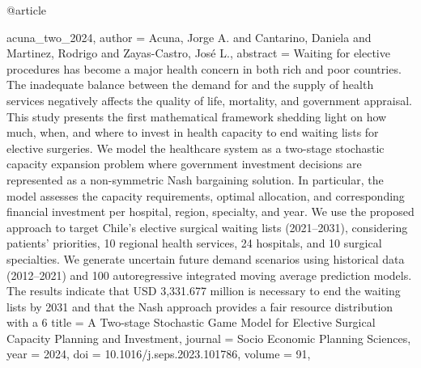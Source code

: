 @article{acuna_two_2024,
  author = {Acuna, Jorge A. and Cantarino, Daniela and Martinez, Rodrigo and Zayas-Castro, José L.},
  abstract = {Waiting for elective procedures has become a major health concern in both rich and poor countries. The inadequate balance between the demand for and the supply of health services negatively affects the quality of life, mortality, and government appraisal. This study presents the first mathematical framework shedding light on how much, when, and where to invest in health capacity to end waiting lists for elective surgeries. We model the healthcare system as a two-stage stochastic capacity expansion problem where government investment decisions are represented as a non-symmetric Nash bargaining solution. In particular, the model assesses the capacity requirements, optimal allocation, and corresponding financial investment per hospital, region, specialty, and year. We use the proposed approach to target Chile's elective surgical waiting lists (2021–2031), considering patients’ priorities, 10 regional health services, 24 hospitals, and 10 surgical specialties. We generate uncertain future demand scenarios using historical data (2012–2021) and 100 autoregressive integrated moving average prediction models. The results indicate that USD 3,331.677 million is necessary to end the waiting lists by 2031 and that the Nash approach provides a fair resource distribution with a 6%
  title = {{A} {Two-stage} {Stochastic} {Game} {Model} {for} {Elective} {Surgical} {Capacity} {Planning} {and} {Investment}},
  journal = {Socio Economic Planning Sciences},
  year = {2024},
  doi = {10.1016/j.seps.2023.101786},
  volume = {91},
}

}
